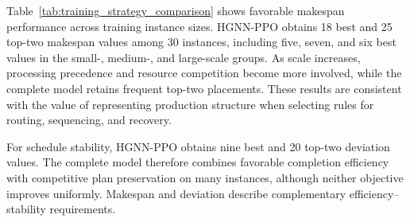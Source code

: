 \begin{table}[tp]
\par\medskip
\noindent\begin{minipage}[t]{0.485\textwidth}
\normalsize
Table~\ref{tab:training_strategy_comparison} shows favorable makespan performance across training instance sizes.
HGNN-PPO obtains 18 best and 25 top-two makespan values among 30 instances, including five, seven,
and six best values in the small-, medium-, and large-scale groups. As scale increases,
processing precedence and resource competition become more involved, while the complete model retains
frequent top-two placements. These results are consistent with the value of representing production structure
when selecting rules for routing, sequencing, and recovery.
\end{minipage}\hfill
\begin{minipage}[t]{0.485\textwidth}
\normalsize
For schedule stability, HGNN-PPO obtains nine best and 20 top-two deviation values.
The complete model therefore combines favorable completion efficiency with competitive plan preservation on many instances,
although neither objective improves uniformly. Makespan and deviation describe complementary efficiency--stability requirements.
\end{minipage}
\end{table}

